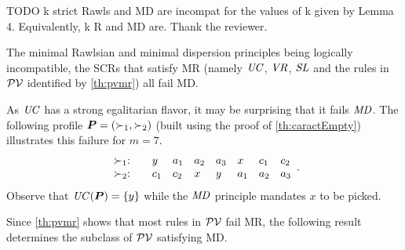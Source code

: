 \documentclass[pagesize, twoside=off, bibliography=totoc, DIV=calc, fontsize=12pt, a4paper]{scrartcl}
\begin{document}
\begin{remark}
TODO k strict Rawls and MD are incompat for the values of k given by Lemma 4. Equivalently, k R and MD are.
Thank the reviewer.
\end{remark}

The minimal Rawlsian and minimal dispersion principles being logically incompatible, the SCRs that satisfy MR (namely $\mathit{UC}$, $\mathit{VR}$, $\mathit{SL}$ and the rules in $\mathcal{PV}$ identified by \cref{th:pvmr}) all fail MD. 

\begin{remark}
	As $\mathit{UC}$ has a strong egalitarian flavor, it may be surprising that it fails $\mathit{MD}$. The following profile $\bm{P} = (\succ_1, \succ_2)$ (built using the proof of \cref{th:caractEmpty}) illustrates this failure for $m = 7$.
	\begin{equation}
		\begin{array}{l @{:\hskip 2em} *7{l}}
			\pref_1&y& a_1 & a_2 & a_3 & x & c_1 & c_2\\
			\pref_2&c_1& c_2 & x & y & a_1 & a_2 & a_3\\
		\end{array}.
	\end{equation}
	Observe that $\mathit{UC}(\bm{P}) = \{y\}$ while the $\mathit{MD}$ principle mandates $x$ to be picked.
\end{remark}

Since \cref{th:pvmr} shows that most rules in $\mathcal{PV}$ fail MR, the following result determines the subclass of $\mathcal{PV}$ satisfying MD. 
\end{document}
